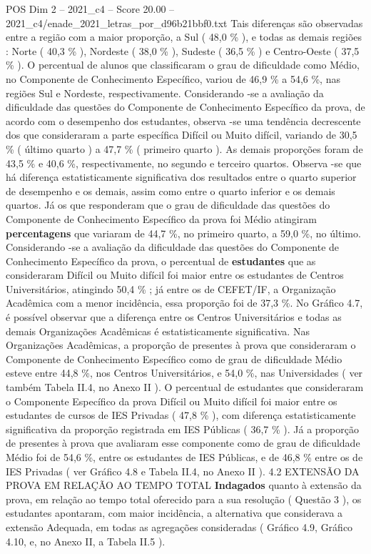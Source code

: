 \begin{textsample}{POS Dim 2 – 2021\_c4 – Score 20.00 – 2021\_c4/enade\_2021\_letras\_por\_d96b21bbf0.txt}
Tais diferenças são observadas entre a região com a maior proporção, a Sul ( 48,0 \% ), e todas as demais regiões : Norte ( 40,3 \% ), Nordeste ( 38,0 \% ), Sudeste ( 36,5 \% ) e Centro-Oeste ( 37,5 \% ).
O percentual de alunos que classificaram o grau de dificuldade como Médio, no Componente de Conhecimento Específico, variou de 46,9 \% a 54,6 \%, nas regiões Sul e Nordeste, respectivamente.
Considerando -se a avaliação da dificuldade das questões do Componente de Conhecimento Específico da prova, de acordo com o desempenho dos estudantes, observa -se uma tendência decrescente dos que consideraram a parte específica Difícil ou Muito difícil, variando de 30,5 \% ( último quarto ) a 47,7 \% ( primeiro quarto ).
As demais proporções foram de 43,5 \% e 40,6 \%, respectivamente, no segundo e terceiro quartos.
Observa -se que há diferença estatisticamente significativa dos resultados entre o quarto superior de desempenho e os demais, assim como entre o quarto inferior e os demais quartos.
Já os que responderam que o grau de dificuldade das questões do Componente de Conhecimento Específico da prova foi Médio atingiram \textbf{percentagens} que variaram de 44,7 \%, no primeiro quarto, a 59,0 \%, no último.
Considerando -se a avaliação da dificuldade das questões do Componente de Conhecimento Específico da prova, o percentual de \textbf{estudantes} que as consideraram Difícil ou Muito difícil foi maior entre os estudantes de Centros Universitários, atingindo 50,4 \% ; já entre os de CEFET/IF, a Organização Acadêmica com a menor incidência, essa proporção foi de 37,3 \%.
No Gráfico 4.7, é possível observar que a diferença entre os Centros Universitários e todas as demais Organizações Acadêmicas é estatisticamente significativa.
Nas Organizações Acadêmicas, a proporção de presentes à prova que consideraram o Componente de Conhecimento Específico como de grau de dificuldade Médio esteve entre 44,8 \%, nos Centros Universitários, e 54,0 \%, nas Universidades ( ver também Tabela II.4, no Anexo II ).
O percentual de estudantes que consideraram o Componente Específico da prova Difícil ou Muito difícil foi maior entre os estudantes de cursos de IES Privadas ( 47,8 \% ), com diferença estatisticamente significativa da proporção registrada em IES Públicas ( 36,7 \% ).
Já a proporção de presentes à prova que avaliaram esse componente como de grau de dificuldade Médio foi de 54,6 \%, entre os estudantes de IES Públicas, e de 46,8 \% entre os de IES Privadas ( ver Gráfico 4.8 e Tabela II.4, no Anexo II ). 4.2 EXTENSÃO DA PROVA EM RELAÇÃO AO TEMPO TOTAL \textbf{Indagados} quanto à extensão da prova, em relação ao tempo total oferecido para a sua resolução ( Questão 3 ), os estudantes apontaram, com maior incidência, a alternativa que considerava a extensão Adequada, em todas as agregações consideradas ( Gráfico 4.9, Gráfico 4.10, e, no Anexo II, a Tabela II.5 ).

\end{textsample}
